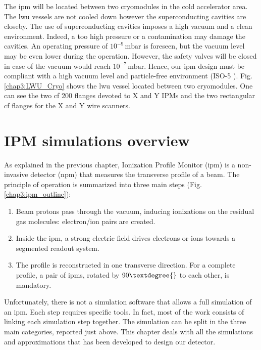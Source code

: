 \begin{refsection}
	The \acrshort{ipm} will be located between two cryomodules in the cold accelerator area. The \acrshort{lwu} vessels are not cooled down however the superconducting cavities are closeby. The use of superconducting cavities imposes a high vacuum and a clean environment. Indeed, a too high pressure or a contamination may damage the cavities. An operating pressure of \(10^{-9}\,\mathrm{mbar}\) is foreseen, but the vacuum level may be even lower during the operation. However, the safety valves will be closed in case of the vacuum would reach \(10^{-7}\,\mathrm{mbar}\). Hence, our \acrshort{ipm} design must be compliant with a high vacuum level and particle-free environment (ISO-5 \cite{ISO14644}). Fig. \ref{chap3:LWU_Cryo} shows the \acrshort{lwu} vessel located between two cryomodules. One can see the two \acrshort{cf} 200 flanges devoted to X and Y IPMs and the two rectangular \acrshort{cf} flanges for the X and Y wire scanners.

	\section{IPM simulations overview}

	

	As explained in the previous chapter, Ionization Profile Monitor (\acrshort{ipm}) is a non-invasive detector (\acrshort{npm}) that measures the transverse profile of a beam.
	The principle of operation is summarized into three main steps (Fig. \ref{chap3:ipm_outline}):
	\begin{enumerate}
		\item Beam protons pass through the vacuum, inducing ionizations on the residual gas molecules: electron/ion pairs are created.
		\item Inside the \acrshort{ipm}, a strong electric field drives electrons or ions towards a segmented readout system.
		\item The profile is reconstructed in one transverse direction. For a complete profile, a pair of \acrshort{ipm}s, rotated by $90\textdegree{}$ to each other, is mandatory.
	\end{enumerate}

	Unfortunately, there is not a simulation software that allows a full simulation of an \acrshort{ipm}. Each step requires specific tools. In fact, most of the work consists of linking each simulation step together. The simulation can be split in the three main categories, reported just above. This chapter deals with all the simulations and approximations that has been developed to design our detector.


\end{refsection}
